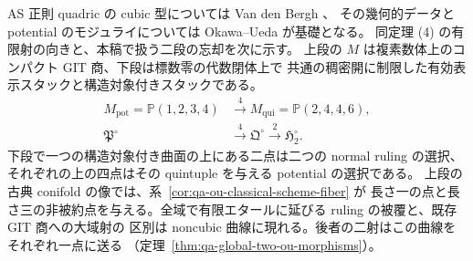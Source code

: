 \documentclass[a4paper,11pt]{ltjsarticle}
\numberwithin{equation}{section}
\theoremstyle{plain}
\theoremstyle{definition}
\theoremstyle{remark}
\begin{document}
AS 正則 quadric の cubic 型については Van den Bergh \cite{VdB2011}、
その幾何的データと potential のモジュライについては
Okawa--Ueda \cite[Theorem 1.1]{OU2014} が基礎となる。
同定理 (4) の有限射の向きと、本稿で扱う二段の忘却を次に示す。
上段の $M$ は複素数体上のコンパクト GIT 商、下段は標数零の代数閉体上で
共通の稠密開に制限した有効表示スタックと構造対象付きスタックである。
\[
 \begin{aligned}
 M_{\mathrm{pot}}=\mathbb P(1,2,3,4)
   &\xrightarrow{\ 4\ } M_{\mathrm{qui}}=\mathbb P(2,4,4,6),\\
 \mathfrak P^{\circ}
   &\xrightarrow{\ 4\ } \mathfrak Q^{\circ}
    \xrightarrow{\ 2\ } \mathfrak H_2^{\circ}.
 \end{aligned}
\]
下段で一つの構造対象付き曲面の上にある二点は二つの normal ruling の選択、
それぞれの上の四点はその quintuple を与える potential の選択である。
上段の古典 conifold の像では、系~\ref{cor:qa-ou-classical-scheme-fiber} が
長さ一の点と長さ三の非被約点を与える。全域で有限エタールに延びる ruling の被覆と、既存 GIT 商への大域射の
区別は noncubic 曲線に現れる。後者の二射はこの曲線をそれぞれ一点に送る
（定理~\ref{thm:qa-global-two-ou-morphisms}）。
\end{document}
